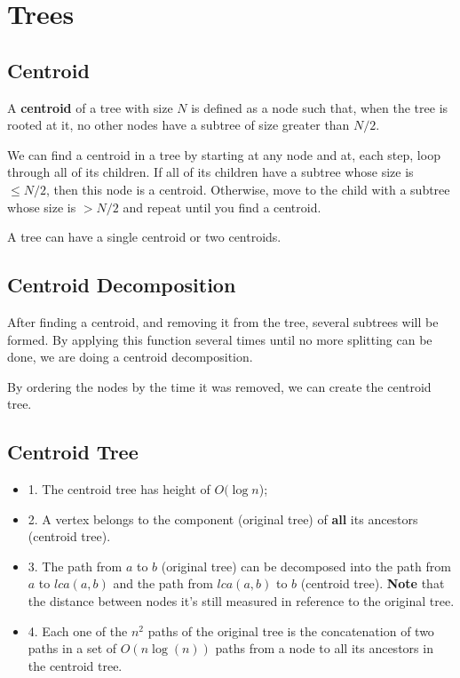 
\section{Trees}


\subsection{Centroid}

A \textbf{centroid} of a tree with size $N$ is defined as a node such that, when the tree is rooted
at it, no other nodes have a subtree of size greater than $N/2$.

We can find a centroid in a tree by starting at any node and at, each step, 
loop through all of its children. 
If all of its children have a subtree whose size is $ \leq N/2$, then this node is a centroid. 
Otherwise, move to the child with a subtree whose size is $> N/2$ 
and repeat until you find a centroid.

A tree can have a single centroid or two centroids.


\subsection{Centroid Decomposition}

After finding a centroid, and removing it from the tree, several subtrees will be formed.
By applying this function several times until no more splitting can be done,
we are doing a centroid decomposition. 

By ordering the nodes by the time it was removed, we can create the centroid tree.

\subsection{Centroid Tree}

\begin{itemize}
	\item 1. The centroid tree has height of $O(\log{n}$);
	\item 2. A vertex belongs to the component (original tree) of \textbf{all} its ancestors (centroid tree).
	\item 3. The path from $a$ to $b$ (original tree) can be decomposed into the path from $a$ to $lca(a,b)$ 
	and the path from $lca(a,b)$ to $b$ (centroid tree).
	\textbf{Note} that the distance between nodes it's still measured in reference to the original tree.
	\item 4. Each one of the $n^2$ paths of the original tree is the concatenation of 
	two paths in a set of $O(n \log(n))$ paths from a node to all its ancestors in the 
	centroid tree.
\end{itemize}

